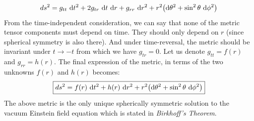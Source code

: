 $$ds^2 = g_{tt}\ \dd t^2 + 2g_{tr}\ \dd t \ \dd r +g_{rr}\ \dd r^2+ r^2\qty(\dd \theta^2 + \sin^2\theta \ \dd \phi^2)$$
From the time-independent consideration, we can say that none of the metric tensor components must depend on time. They should only depend on $r$ (since spherical symmetry is also there). And under time-reversal, the metric should be invariant under $t\to -t$ from which we have $g_{tr}=0$. Let us denote $g_{tt} = f(r)$ and $g_{rr}=h(r)$. The final expression of the metric, in terms of the two unknowns $f(r)$ and $h(r)$ becomes:
\begin{equation}
    \boxed{ds^2 = f(r)\ \dd t^2 +h(r)\ \dd r^2+ r^2\qty(\dd \theta^2 + \sin^2\theta \ \dd \phi^2)} \label{eqn:metric}
\end{equation}
The above metric is the only unique spherically symmetric solution to the vacuum Einstein field equation which is stated in \textit{Birkhoff's Theorem}.